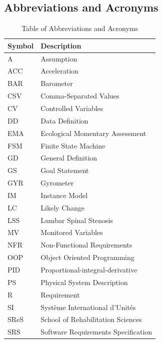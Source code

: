 \documentclass[12pt, titlepage]{article}
\begin{document}
\subsection{Abbreviations and Acronyms}

\renewcommand{\arraystretch}{1.2}
\begin{table}[H]
	\noindent\begin{tabular}{l l} 
	  \toprule		
	  \textbf{Symbol} & \textbf{Description}\\
	  \midrule 
	  A & Assumption\\
	  ACC & Acceleration\\
	  BAR & Barometer\\
	  CSV & Comma-Separated Values\\
	  CV & Controlled Variables\\
	  DD & Data Definition\\
	  EMA & Ecological Momentary Assessment\\
	  FSM & Finite State Machine\\
	  GD & General Definition\\
	  GS & Goal Statement\\
	  GYR & Gyrometer\\
	  IM & Instance Model\\
	  LC & Likely Change\\
	  LSS & Lumbar Spinal Stenosis\\
	  MV & Monitored Variables\\
	  NFR & Non-Functional Requirements\\
	  OOP & Object Oriented Programming\\
	  PID & Proportional-integral-derivative\\
	  PS & Physical System Description\\
	  R & Requirement\\
	  SI & Syst\`{e}me International d'Unit\'{e}s\\
	  SReS & School of Rehabilitation Sciences\\
	  SRS & Software Requirements Specification\\
	
	  \bottomrule
	\end{tabular}\\
	\caption{\label{abbacr}Table of Abbreviations and Acronyms}  
\end{table}

\newpage

\tableofcontents
\newpage
\listoftables %
\end{document}
